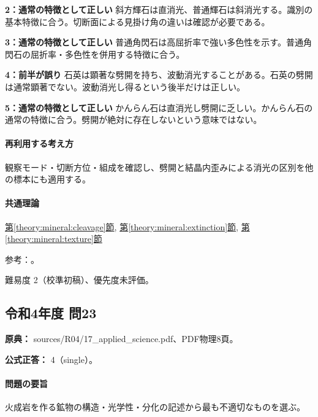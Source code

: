 \noindent\textbf{2：通常の特徴として正しい} 斜方輝石は直消光、普通輝石は斜消光する。識別の基本特徴に合う。切断面による見掛け角の違いは確認が必要である。\par

\noindent\textbf{3：通常の特徴として正しい} 普通角閃石は高屈折率で強い多色性を示す。普通角閃石の屈折率・多色性を併用する特徴に合う。\par

\noindent\textbf{4：前半が誤り} 石英は顕著な劈開を持ち、波動消光することがある。石英の劈開は通常顕著でない。波動消光し得るという後半だけは正しい。\par

\noindent\textbf{5：通常の特徴として正しい} かんらん石は直消光し劈開に乏しい。かんらん石の通常の特徴に合う。劈開が絶対に存在しないという意味ではない。\par

\paragraph{再利用する考え方} 観察モード・切断方位・組成を確認し、劈開と結晶内歪みによる消光の区別を他の標本にも適用する。

\paragraph{共通理論} \hyperref[theory:mineral:cleavage]{第\ref*{theory:mineral:cleavage}節}, \hyperref[theory:mineral:extinction]{第\ref*{theory:mineral:extinction}節}, \hyperref[theory:mineral:texture]{第\ref*{theory:mineral:texture}節}

\par 参考：\cite{hom_quartz,hom_biotite,hom_forsterite,nelson_inosilicates,nelson_biaxial}。

\par 難易度 2（校準初稿）、優先度未評価。

\subsection{令和4年度 問23}
\label{q:r04-reg-applied-23}

\noindent\textbf{原典：} sources/R04/17\_applied\_science.pdf、PDF物理8頁。

\textbf{公式正答：} 4（single）。

\paragraph{問題の要旨} 火成岩を作る鉱物の構造・光学性・分化の記述から最も不適切なものを選ぶ。


